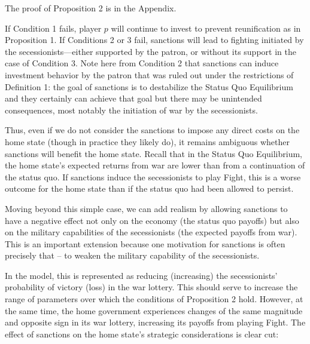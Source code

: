 \documentclass[11pt,letterpaper, notitlepage]{article}
\begin{document}
The proof of Proposition 2 is in the Appendix.

If Condition 1 fails, player $p$ will continue to invest to prevent reunification as in Proposition 1. If Conditions 2 or 3 fail, sanctions will lead to fighting initiated by the secessionists---either supported by the patron, or without its support in the case of Condition 3. Note here from Condition 2 that sanctions can induce investment behavior by the patron that was ruled out under the restrictions of Definition 1: the goal of sanctions is to destabilize the Status Quo Equilibrium and they certainly can achieve that goal but there may be unintended consequences, most notably the initiation of war by the secessionists. 

Thus, even if we do not consider the sanctions to impose any direct costs on the home state (though in practice they likely do), it remains ambiguous whether sanctions will benefit the home state. Recall that in the Status Quo Equilibrium, the home state's expected returns from war are lower than from a continuation of the status quo. If sanctions induce the secessionists to play Fight, this is a worse outcome for the home state than if the status quo had been allowed to persist.  


Moving beyond this simple case, we can add realism by allowing sanctions to have a negative effect not only on the economy (the status quo payoffs) but also on the military capabilities of the secessionists (the expected payoffs from war). This is an important extension because one motivation for sanctions is often precisely that -- to weaken the military capability of the secessionists. 

In the model, this is represented as reducing (increasing) the secessionists' probability of victory (loss) in the war lottery. This should serve to increase the range of parameters over which the conditions of Proposition 2 hold. However, at the same time, the home government experiences changes of the same magnitude and opposite sign in its war lottery, increasing its payoffs from playing Fight. The effect of sanctions on the home state's strategic considerations is clear cut:
\end{document}
